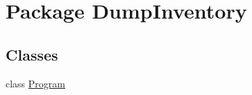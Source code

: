 \hypertarget{namespace_dump_inventory}{\section{Package Dump\-Inventory}
\label{namespace_dump_inventory}
}
\subsection*{Classes}
\begin{DoxyCompactItemize}
\item 
class \hyperlink{class_dump_inventory_1_1_program}{Program}
\end{DoxyCompactItemize}
